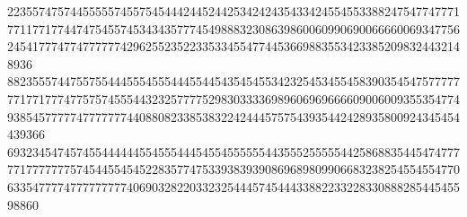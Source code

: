 2235574757445555574557545444244524425342424354334245545533882475477477717711771774474754557453434357774549888323086398600609906900666600693477562454177747747777774296255235223353345547744536698835534233852098324432148936\EndRow%
882355574475575544455545554445544543545455342325453455458390354547577777771771777477575745554432325777752983033336989606969666609006009355354774938545777774777777744088082338538322424445757543935442428935800924345454439366\EndRow%
69323454745745544444455455544454554555555443555255555442586883544547477777177777775745445545452283577475339383939086968980990668323825455455477063354777747777777774069032822033232544457454443388223322833088828544545598860\EndRow%
